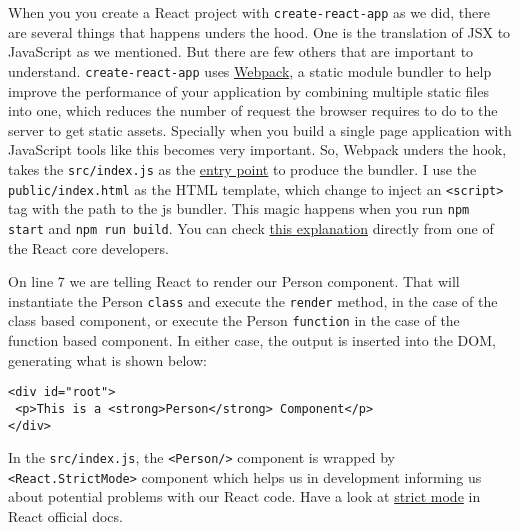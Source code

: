 \documentclass[a4paper, oneside, titlepage, 12pt]{book}
\begin{document}
\begin{displayquote}
{\small When you you create a React project with \texttt{create-react-app} as we did, there are several things that happens unders the hood. One is the translation of JSX to JavaScript as we mentioned. But there are few others that are important to understand. \texttt{create-react-app} uses \href{https://webpack.js.org/}{Webpack}, a static module bundler to help improve the performance of your application by combining multiple static files into one, which reduces the number of request the browser requires to do to the server to get static assets. Specially when you build a single page application with JavaScript tools like this becomes very important. So, Webpack unders the hook, takes the \texttt{src/index.js} as the \href{https://webpack.js.org/concepts/#entry}{entry point} to produce the bundler. I use the \texttt{public/index.html} as the HTML template, which change to inject an \texttt{<script>} tag with the path to the js bundler. This magic happens when you run \texttt{npm start} and \texttt{npm run build}. You can check \href{https://stackoverflow.com/questions/42438171/wheres-the-connection-between-index-html-and-index-js-in-a-create-react-app-app}{this explanation} directly from one of the React core developers.}
\end{displayquote}

On line 7 we are telling React to render our Person component. That will instantiate the Person \texttt{class} and execute the \texttt{render} method, in the case of the class based component, or execute the Person \texttt{function} in the case of the function based component. In either case, the output is inserted into the DOM, generating what is shown below:

\begin{verbatim}
<div id="root">
 <p>This is a <strong>Person</strong> Component</p>
</div>
\end{verbatim}

In the \texttt{src/index.js}, the \texttt{<Person/>} component is wrapped by \texttt{<React.StrictMode>} component which helps us in development informing us about potential problems with our React code. Have a look at \href{https://reactjs.org/docs/strict-mode.html}{strict mode} in React official docs.
\end{document}
